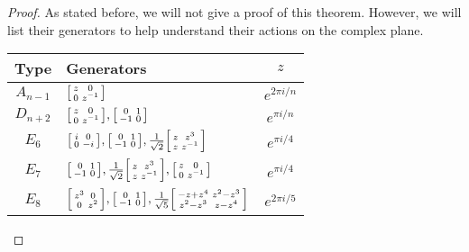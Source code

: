 \documentclass[12pt]{report}
\theoremstyle{remark}
\theoremstyle{definition}
\newenvironment{bsmallmatrix}
	{\left[\begin{smallmatrix}}
	{\end{smallmatrix}\right]}
\begin{document}
    \begin{proof}
        As stated before, we will not give a proof of this theorem. However, we will list their generators to help understand their actions on the complex plane.
        \begin{table}[!h]
            \centering
            \begin{tabular}{|c|l|c|}
            \hline
            Type  & Generators                                           & $z$          \\ \hline
            $A_{n-1}$ & $\begin{bsmallmatrix}z & 0\\ 0 & z^{-1}\end{bsmallmatrix}$ & $e^{2\pi i/n}$ \\ \hline
            $D_{n+2}$ & $\begin{bsmallmatrix}z & 0\\ 0 & z^{-1}\end{bsmallmatrix}, \begin{bsmallmatrix}0 & 1\\ -1 & 0\end{bsmallmatrix}$ & $e^{\pi i/n}$  \\ \hline
            $E_6$ & $\begin{bsmallmatrix}i & 0\\ 0 & -i\end{bsmallmatrix}, \begin{bsmallmatrix}0 & 1\\ -1 & 0\end{bsmallmatrix}, \frac{1}{\sqrt{2}}\begin{bsmallmatrix}z & z^3\\ z & z^{-1}\end{bsmallmatrix}$ & $e^{\pi i/4}$\\ \hline
            $E_7$ & $\begin{bsmallmatrix}0 & 1\\ -1 & 0\end{bsmallmatrix}, \frac{1}{\sqrt{2}}\begin{bsmallmatrix}z & z^3\\ z & z^{-1}\end{bsmallmatrix}, \begin{bsmallmatrix}z & 0\\ 0 & z^{-1}\end{bsmallmatrix}$ & $e^{\pi i/4}$\\ \hline
            $E_8$ & $\begin{bsmallmatrix}z^3 & 0\\ 0 & z^{2}\end{bsmallmatrix}, \begin{bsmallmatrix}0 & 1\\ -1 & 0\end{bsmallmatrix}, \frac{1}{\sqrt{5}}\begin{bsmallmatrix}-z+z^4 & z^2-z^3\\ z^2-z^3 & z-z^4\end{bsmallmatrix}$ & $e^{2\pi i/5}$ \\ \hline

\end{tabular}
\end{table}
\end{proof}
\end{document}
